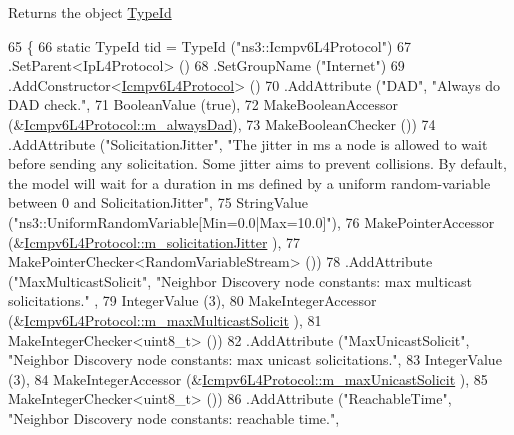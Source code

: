 \begin{DoxyReturn}{Returns}
the object \hyperlink{classns3_1_1TypeId}{Type\+Id} 
\end{DoxyReturn}

\begin{DoxyCode}
65 \{
66   \textcolor{keyword}{static} TypeId tid = TypeId (\textcolor{stringliteral}{"ns3::Icmpv6L4Protocol"})
67     .SetParent<IpL4Protocol> ()
68     .SetGroupName (\textcolor{stringliteral}{"Internet"})
69     .AddConstructor<\hyperlink{classns3_1_1Icmpv6L4Protocol_accdeaa226eb8d84ef23a96e60881f3de}{Icmpv6L4Protocol}> ()
70     .AddAttribute (\textcolor{stringliteral}{"DAD"}, \textcolor{stringliteral}{"Always do DAD check."},
71                    BooleanValue (\textcolor{keyword}{true}),
72                    MakeBooleanAccessor (&\hyperlink{classns3_1_1Icmpv6L4Protocol_aa21acf24e3acd05c073c0b15d94b6759}{Icmpv6L4Protocol::m\_alwaysDad}),
73                    MakeBooleanChecker ())
74     .AddAttribute (\textcolor{stringliteral}{"SolicitationJitter"}, \textcolor{stringliteral}{"The jitter in ms a node is allowed to wait before sending any
       solicitation. Some jitter aims to prevent collisions. By default, the model will wait for a duration in ms
       defined by a uniform random-variable between 0 and SolicitationJitter"},
75                    StringValue (\textcolor{stringliteral}{"ns3::UniformRandomVariable[Min=0.0|Max=10.0]"}),
76                    MakePointerAccessor (&\hyperlink{classns3_1_1Icmpv6L4Protocol_ac7e4a25978a861e34cef7bdd27efb1d9}{Icmpv6L4Protocol::m\_solicitationJitter}
      ),
77                    MakePointerChecker<RandomVariableStream> ())
78     .AddAttribute (\textcolor{stringliteral}{"MaxMulticastSolicit"}, \textcolor{stringliteral}{"Neighbor Discovery node constants: max multicast solicitations."}
      ,
79                    IntegerValue (3),
80                    MakeIntegerAccessor (&\hyperlink{classns3_1_1Icmpv6L4Protocol_a10486bb2cca386e400fa833e19f93502}{Icmpv6L4Protocol::m\_maxMulticastSolicit}
      ),
81                    MakeIntegerChecker<uint8\_t> ())
82     .AddAttribute (\textcolor{stringliteral}{"MaxUnicastSolicit"}, \textcolor{stringliteral}{"Neighbor Discovery node constants: max unicast solicitations."},
83                    IntegerValue (3),
84                    MakeIntegerAccessor (&\hyperlink{classns3_1_1Icmpv6L4Protocol_a772aa2162734a24996b92d673127e7eb}{Icmpv6L4Protocol::m\_maxUnicastSolicit}
      ),
85                    MakeIntegerChecker<uint8\_t> ())
86     .AddAttribute (\textcolor{stringliteral}{"ReachableTime"}, \textcolor{stringliteral}{"Neighbor Discovery node constants: reachable time."},

\end{DoxyCode}
